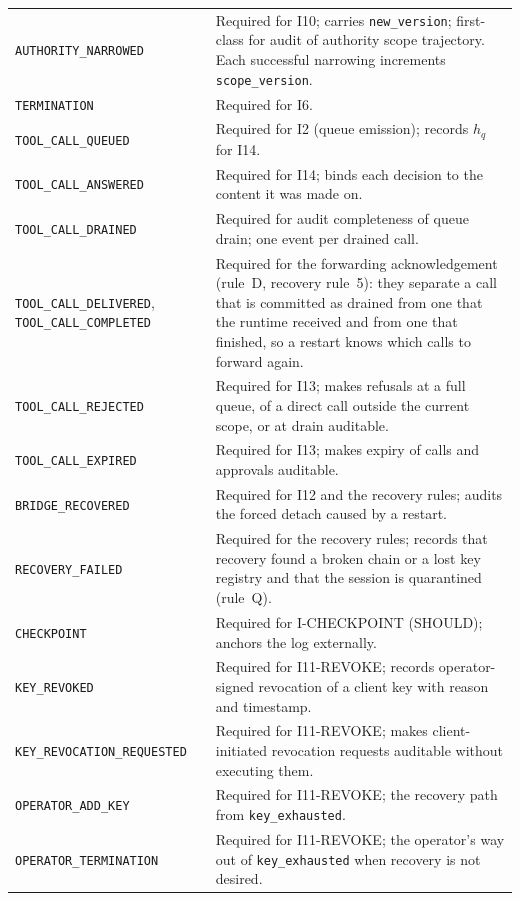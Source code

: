\begin{longtable}{p{} p{}}
\texttt{AUTHORITY\_NARROWED} & Required for I10; carries
\texttt{new\_version}; first-class for audit of authority scope
trajectory. Each successful narrowing increments
\texttt{scope\_version}. \\
\texttt{TERMINATION} & Required for I6. \\
\texttt{TOOL\_CALL\_QUEUED} & Required for I2 (queue emission); records
$h_q$ for I14. \\
\texttt{TOOL\_CALL\_ANSWERED} & Required for I14; binds each decision to
the content it was made on. \\
\texttt{TOOL\_CALL\_DRAINED} & Required for audit completeness of
queue drain; one event per drained call. \\
\texttt{TOOL\_CALL\_DELIVERED}, \texttt{TOOL\_CALL\_COMPLETED} & Required
for the forwarding acknowledgement (rule~D, recovery rule~5): they
separate a call that is committed as drained from one that the runtime
received and from one that finished, so a restart knows which calls to
forward again. \\
\texttt{TOOL\_CALL\_REJECTED} & Required for I13; makes refusals at a
full queue, of a direct call outside the current scope, or at drain
auditable. \\
\texttt{TOOL\_CALL\_EXPIRED} & Required for I13; makes expiry of calls
and approvals auditable. \\
\texttt{BRIDGE\_RECOVERED} & Required for I12 and the recovery rules;
audits the forced detach caused by a restart. \\
\texttt{RECOVERY\_FAILED} & Required for the recovery rules;
records that recovery found a broken chain or a lost key registry and
that the session is quarantined (rule~Q). \\
\texttt{CHECKPOINT} & Required for I-CHECKPOINT (SHOULD); anchors the
log externally. \\
\texttt{KEY\_REVOKED} & Required for I11-REVOKE; records operator-signed
revocation of a client key with reason and timestamp. \\
\texttt{KEY\_REVOCATION\_REQUESTED} & Required for I11-REVOKE; makes
client-initiated revocation requests auditable without executing them. \\
\texttt{OPERATOR\_ADD\_KEY} & Required for I11-REVOKE; the recovery
path from \texttt{key\_exhausted}. \\
\texttt{OPERATOR\_TERMINATION} & Required for I11-REVOKE; the
operator's way out of \texttt{key\_exhausted} when recovery is not
desired. \\

\end{longtable}
